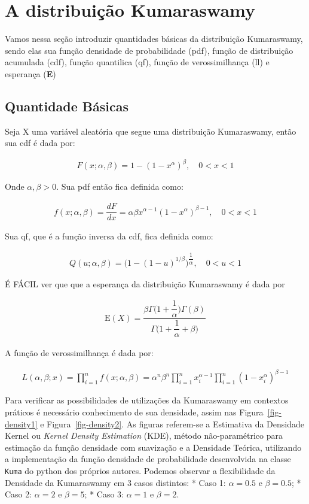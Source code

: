 \documentclass[
]{article}
\begin{document}
\section{\centering A distribuição Kumaraswamy}

Vamos nessa seção introduzir quantidades básicas da distribuição
Kumaraswamy, sendo elas sua função densidade de probabilidade (pdf),
função de distribuição acumulada (cdf), função quantilica (qf), função
de verossimilhança (ll) e esperança (\textbf{E})

\subsection{Quantidade Básicas}

Seja X uma variável aleatória que segue uma distribuição Kumaraswamy,
então sua cdf é dada por:

\begin{align}
F(x;\alpha, \beta) = 1 - (1 - x^\alpha)^\beta,  \quad 0 < x< 1
\end{align}

Onde \(\alpha, \beta > 0\). Sua pdf então fica definida como:

\begin{align}
f(x;\alpha, \beta) = \dfrac{dF}{dx} =\alpha\beta x^{\alpha - 1}(1 - x^\alpha)^{\beta  - 1}, \quad 0 < x< 1
\end{align}

Sua qf, que é a função inversa da cdf, fica definida como:

\begin{align}
Q(u;\alpha, \beta) = \bigg(1 - (1 - u)^{1/\beta}\bigg)^{\dfrac{1}{\alpha}}, \quad 0<u<1
\end{align}

É FÁCIL ver que que a esperança da distribuição Kumaraswamy é dada por

\begin{align}
\text{E}(X) = \dfrac{\beta\Gamma\bigg(1 + \dfrac{1}{\alpha}\bigg)\Gamma(\beta)}{\Gamma\bigg(1 + \dfrac{1}{\alpha} + \beta\bigg)}
\end{align}

A função de verossimilhança é dada por:

\begin{align}
L(\alpha, \beta; x) = \prod_{i=1}^{n}f(x;\alpha, \beta) = \alpha^n \beta^n \prod_{i=1}^{n}x_i^{\alpha - 1}\prod_{i=1}^{n}(1-x_i^{\alpha})^{\beta-1}
\end{align}

Para verificar as possibilidades de utilizações da Kumaraswamy em
contextos práticos é necessário conhecimento de sua densidade, assim nas
Figura~\ref{fig-density1} e Figura~\ref{fig-density2}. As figuras
referem-se a Estimativa da Densidade Kernel ou \emph{Kernel Density
Estimation} (KDE), método não-paramétrico para estimação da função
densidade com suavização e a Densidade Teórica, utilizando a
implementação da função densidade de probabilidade desenvolvida na
classe \texttt{Kuma} do python dos próprios autores. Podemos observar a
flexibilidade da Densidade da Kumaraswamy em 3 casos distintos: * Caso
1: \(\alpha = 0.5\) e \(\beta = 0.5\); * Caso 2: \(\alpha = 2\) e
\(\beta = 5\); * Caso 3: \(\alpha = 1\) e \(\beta = 2\).
\end{document}
